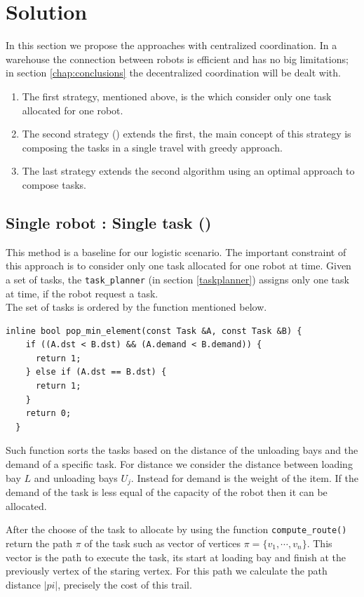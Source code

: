 \section{Solution}

In this section we propose the approaches with centralized coordination.
In a warehouse the connection between robots is efficient and has no big limitations;
in section \ref{chap:conclusions} the decentralized coordination will be dealt with.
\begin{enumerate}
\item The first strategy, mentioned above, is the \srst which consider only 
one task allocated for one robot.

\item The second strategy (\gsp) extends the first, the main concept of this strategy 
is composing the tasks in a single travel with greedy approach. 

\item The last strategy \sps extends the second algorithm using an optimal approach
to compose tasks. 
\end{enumerate}

\subsection{Single robot : Single task (\srst)}

This method is a baseline for our logistic scenario.
The important constraint of this approach is to consider only one task allocated for 
one robot at time.
Given a set of tasks, the \texttt{task\_planner} (in section \ref{taskplanner}) assigns only one task at time,
if the robot request a task.
\\
The set of tasks is ordered by the function mentioned below.
\begin{lstlisting}
inline bool pop_min_element(const Task &A, const Task &B) {
    if ((A.dst < B.dst) && (A.demand < B.demand)) {
      return 1;
    } else if (A.dst == B.dst) {
      return 1;
    }
    return 0;
  }
\end{lstlisting}
Such function sorts the tasks based on the distance of the unloading bays and the demand of a specific task.
For distance we consider the distance between loading bay $L$ and unloading bays $U_j$.
Instead for demand is the weight of the item. If the demand of the task is less equal of 
the capacity of the robot then it can  be allocated.

After the choose of the task to allocate by using the function \texttt{compute\_route()} return the path $\pi$ of the task such as vector of vertices $\pi = \{v_1,\cdots,v_n\}$. 
This vector is the path to execute the task, its start at loading bay and finish at the previously vertex of the staring vertex.
For this path we calculate the path distance $|pi|$, precisely the cost of this trail.

